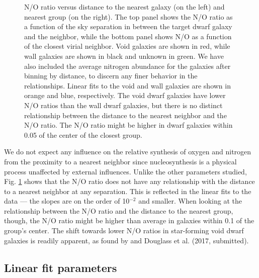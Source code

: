 \begin{figure}
    \caption[N/O versus distance to nearest neighbor and group]{N/O ratio versus 
    distance to the nearest galaxy (on the left) and nearest group (on the 
    right).  The top panel shows the N/O ratio as a function of the sky 
    separation in \hMpc between the target dwarf galaxy and the neighbor, while 
    the bottom panel shows N/O as a function of the closest virial neighbor.  
    Void galaxies are shown in red, while wall galaxies are shown in black and 
    unknown in green.  We have also included the average nitrogen abundance for 
    the galaxies after binning by distance, to discern any finer behavior in the 
    relationships.  Linear fits to the void and wall galaxies are shown in 
    orange and blue, respectively.  The void dwarf galaxies have lower N/O 
    ratios than the wall dwarf galaxies, but there is no distinct relationship 
    between the distance to the nearest neighbor and the N/O ratio.  The N/O 
    ratio might be higher in dwarf galaxies within 0.05 \hMpc of the center of 
    the closest group.}
    \label{fig:NO}
\end{figure}

We do not expect any influence on the relative synthesis of oxygen and nitrogen 
from the proximity to a nearest neighbor since nucleosynthesis is a physical 
process unaffected by external influences.  Unlike the other parameters studied, 
Fig. \ref{fig:NO} shows that the N/O ratio does not have any relationship with 
the distance to a nearest neighbor at any separation.  This is reflected in the 
linear fits to the data --- the slopes are on the order of 10$^{-2}$ and 
smaller.  When looking at the relationship between the N/O ratio and the 
distance to the nearest group, though, the N/O ratio might be higher than 
average in galaxies within 0.1 \hMpc of the group's center.  The shift towards 
lower N/O ratios in star-forming void dwarf galaxies is readily apparent, as 
found by \cite{Douglass17b} and Douglass et al. (2017, submitted).


\subsection{Linear fit parameters}

